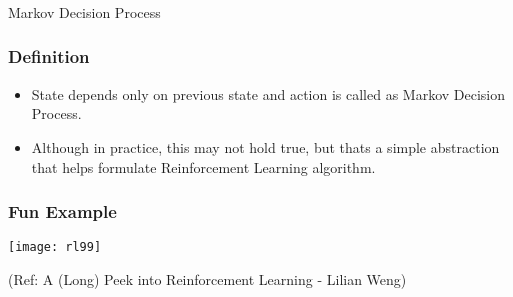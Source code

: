 \begin{frame}[fragile]\frametitle{}
\begin{center}
{\Large Markov Decision Process}
\end{center}
\end{frame}

\begin{frame}[fragile]\frametitle{Definition}

\begin{itemize}
\item State depends only on previous state and action is called as Markov Decision Process.
\item Although in practice, this may not hold true, but thats a simple abstraction that helps formulate Reinforcement Learning algorithm.
\end{itemize}

\end{frame}

\begin{frame}[fragile]\frametitle{Fun Example}



\begin{center}
\texttt{[image: rl99]}
\end{center}


{\tiny (Ref: A (Long) Peek into Reinforcement Learning - Lilian Weng)}


\end{frame}

